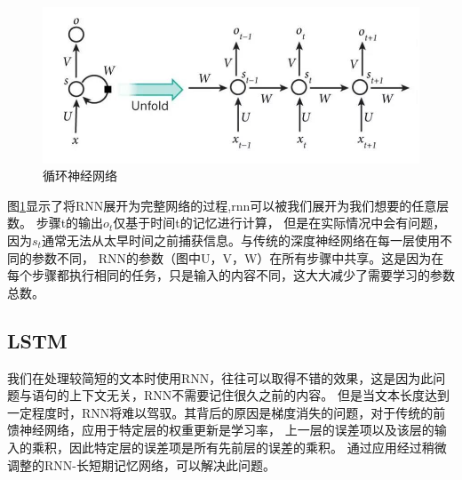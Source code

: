 \begin{figure}[htbp]
  \centering
  \includegraphics[scale=0.5]{./images/rnn.jpg}
  \caption{循环神经网络\cite{cho2014learning}}
  \label{fig:rnn}
\end{figure}

图\ref{fig:rnn}显示了将RNN展开为完整网络的过程,rnn可以被我们展开为我们想要的任意层数。
步骤t的输出$o_{t}$仅基于时间t的记忆进行计算，
  但是在实际情况中会有问题，因为$s_{t}$通常无法从太早时间之前捕获信息。与传统的深度神经网络在每一层使用不同的参数不同，
  RNN的参数（图中U，V，W）在所有步骤中共享。这是因为在每个步骤都执行相同的任务，只是输入的内容不同，这大大减少了需要学习的参数总数。



  

\subsection{LSTM}
  我们在处理较简短的文本时使用RNN，往往可以取得不错的效果，这是因为此问题与语句的上下文无关，RNN不需要记住很久之前的内容。
  但是当文本长度达到一定程度时，RNN将难以驾驭。其背后的原因是梯度消失的问题，对于传统的前馈神经网络，应用于特定层的权重更新是学习率，
  上一层的误差项以及该层的输入的乘积，因此特定层的误差项是所有先前层的误差的乘积。
  通过应用经过稍微调整的RNN-长短期记忆网络，可以解决此问题。

